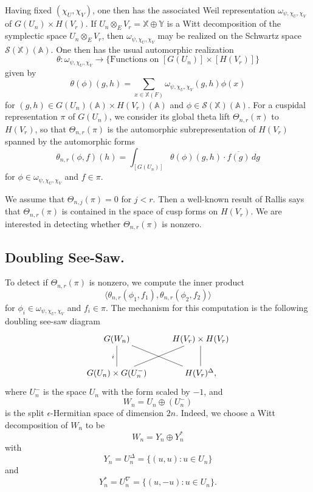 \documentclass[10pt]{amsart}
\theoremstyle{plain}
\numberwithin{equation}{section}
\begin{document}
Having fixed $(\chi_U, \chi_V)$, one then has the associated  Weil representation
 $\omega_{\psi, \chi_U,\chi_V}$ of $G(U_n) \times H(V_r)$. If   $U_n
 \otimes_E V_r  = \mathbb{X} \oplus \mathbb{Y}$ is a Witt
 decomposition of the symplectic space 
 $U_n \otimes_E V_r $, then  $\omega_{\psi, \chi_U,\chi_V}$ may be
 realized on the Schwartz space $\mathcal{S}(\mathbb{X})({\mathbb{A}})$.
 One then has the usual automorphic realization
 \[  \theta: \omega_{\psi, \chi_U,\chi_V} \longrightarrow
 \{\text{Functions on $[G(U_n)] \times [H(V_r)]$} \}\] 
given by
\[
\theta(\phi)(g,h)=\sum_{x\in\mathbb{X}(F)}\omega_{\psi,\chi_U,\chi_V}(g,h)\phi(x)
\]
for $(g,h)\in G(U_n)({\mathbb{A}})\times H(V_r)({\mathbb{A}})$ and
$\phi\in\mathcal{S}(\mathbb{X})({\mathbb{A}})$.
For a cuspidal representation $\pi$ of $G(U_n)$, we consider its
global theta lift $\Theta_{n,r}(\pi)$ to $H(V_r)$, so that
$\Theta_{n,r}(\pi)$ is the automorphic subrepresentation of $H(V_r)$
spanned by the automorphic forms
\[  \theta_{n,r}(\phi,f)(h) = \int_{[G(U_n)]} \theta(\phi) (g,h) \cdot
\overline{f(g)} \, dg \]
for $\phi \in  \omega_{\psi, \chi_U,\chi_V}$ and $f \in \pi$. 
\vskip 5pt

We assume that $\Theta_{n,j}(\pi) = 0$ for $j < r$. Then a well-known
result of Rallis \cite{R1} says that $\Theta_{n,r}(\pi)$ is contained in the
space of cusp forms on $H(V_r)$.  We are interested in detecting
whether $\Theta_{n,r}(\pi)$ is nonzero.
 \vskip 5pt
 
 \subsection{\bf Doubling See-Saw.}
 To detect if $\Theta_{n,r}(\pi)$ is nonzero, we compute the inner product
 \[  \langle \theta_{n,r}(\phi_1, f_1) , \theta_{n,r}(\phi_2, f_2) \rangle \]
 for $\phi_i \in \omega_{\psi, \chi_U,\chi_V}$ and $f_i \in \pi$. The
 mechanism for this computation is the following doubling see-saw
 diagram
  \[
    \xymatrix{
    G(W_n)\ar@{-}[d]_{i}\ar@{-}[dr]&H(V_r)\times H(V_r)\ar@{-}[d]\\
    G(U_n)\times G(U^-_n)\ar@{-}[ur]&H(V_r)^{\Delta},
    }
\]  
where $U_n^-$ is the space $U_n$ with the form scaled by $-1$, and
\[  W_n = U_n \oplus (U_n^-) \]
  is the split $\epsilon$-Hermitian space of dimension $2n$. Indeed,
  we choose a Witt decomposition of $W_n$ to be
  \[ W_n =  Y_n  \oplus Y_n^* \]
  with
  \[ Y_n  = U_n^{\Delta} = \{  (u,u):  u \in U_n \}  \]
   and
   \[ Y_n^* = U_n^{\nabla} = \{ (u, -u): u \in U_n \}. \]
 \vskip 5pt
 
\end{document}
